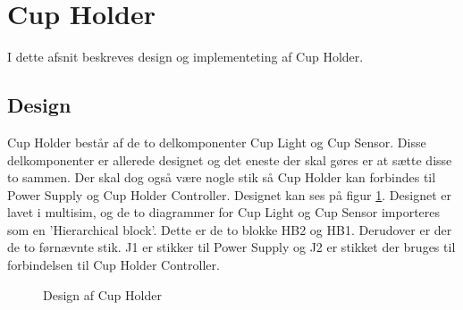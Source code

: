 \documentclass[HardwareDesign/HardwareDesign_main.tex]{subfiles}
\begin{document}
\section{Cup Holder}
I dette afsnit beskreves design og implementeting af Cup Holder.

\subsection{Design}
Cup Holder består af de to delkomponenter Cup Light og Cup Sensor. Disse delkomponenter er allerede designet og det eneste der skal gøres er at sætte disse to sammen. Der skal dog også være nogle stik så Cup Holder kan forbindes til Power Supply og Cup Holder Controller.
Designet kan ses på figur \ref{fig:CupHolderDesign}. Designet er lavet i multisim, og de to diagrammer for Cup Light og Cup Sensor importeres som en 'Hierarchical block'. Dette er de to blokke HB2 og HB1. Derudover er der de to førnævnte stik. J1 er stikker til Power Supply og J2 er stikket der bruges til forbindelsen til Cup Holder Controller. 

\begin{figure}[H]
    \centering
    \caption{Design af Cup Holder}
    \label{fig:CupHolderDesign}
\end{figure}
\end{document}
